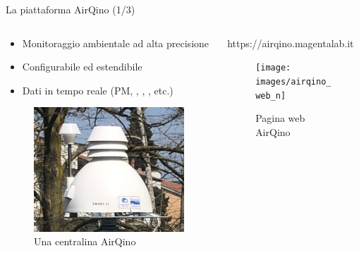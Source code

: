 \begin{frame}{La piattaforma AirQino (1/3)}
\begin{columns}

\begin{column}{0.45\textwidth}

\begin{itemize}
  \item Monitoraggio ambientale ad alta precisione
  \item Configurabile ed estendibile
  \item Dati in tempo reale (PM, , , , etc.)
\end{itemize}\vspace{0.1cm}

\begin{figure}[H]
\centering
\captionsetup{justification=centering}
\includegraphics[width=.6\textwidth]{images/airqino_stazione}
\caption{Una centralina AirQino}
\end{figure}

\end{column}

\begin{column}{0.65\textwidth}

\begin{center}
\alert{https://airqino.magentalab.it}
\vspace{-0.3cm}
\begin{figure}[H]
\centering
\captionsetup{justification=centering}
\texttt{[image: images/airqino\_web\_n]}
\caption{Pagina web AirQino}
\end{figure}
\end{center}

\end{column}

\end{columns}
\end{frame}

